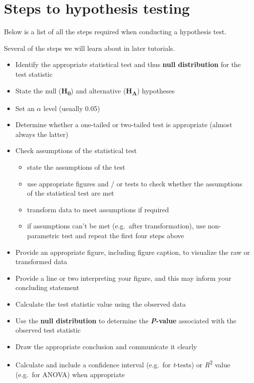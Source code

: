 \documentclass[
]{book}
\providecommand{\tightlist}{%
  \setlength{\itemsep}{0pt}\setlength{\parskip}{0pt}}
\begin{document}
\section{Steps to hypothesis testing}\label{hyp_steps}

Below is a list of all the steps required when conducting a hypothesis test.

Several of the steps we will learn about in later tutorials.

\begin{itemize}
\tightlist
\item
  Identify the appropriate statistical test and thus \textbf{null distribution} for the test statistic
\item
  State the null (\textbf{H\textsubscript{0}}) and alternative (\textbf{H\textsubscript{A}}) hypotheses\\
\item
  Set an \(\alpha\) level (usually 0.05)\\
\item
  Determine whether a one-tailed or two-tailed test is appropriate (almost always the latter)
\item
  Check assumptions of the statistical test

  \begin{itemize}
  \tightlist
  \item
    state the assumptions of the test\\
  \item
    use appropriate figures and / or tests to check whether the assumptions of the statistical test are met
  \item
    transform data to meet assumptions if required
  \item
    if assumptions can't be met (e.g.~after transformation), use non-parametric test and repeat the first four steps above
  \end{itemize}
\item
  Provide an appropriate figure, including figure caption, to visualize the raw or transformed data\\
\item
  Provide a line or two interpreting your figure, and this may inform your concluding statement\\
\item
  Calculate the test statistic value using the observed data\\
\item
  Use the \textbf{null distribution} to determine the \textbf{\emph{P}-value} associated with the observed test statistic\\
\item
  Draw the appropriate conclusion and communicate it clearly\\
\item
  Calculate and include a confidence interval (e.g.~for \emph{t}-tests) or \emph{R}\textsuperscript{2} value (e.g.~for ANOVA) when appropriate
\end{itemize}
\end{document}
